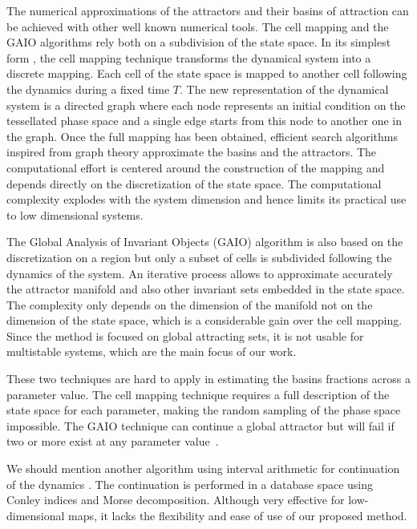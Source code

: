 \documentclass[preprint,superscriptaddress,
nofootinbib,amsmath,amssymb,aps]{revtex4-1}
\begin{document}
The numerical approximations of the attractors and their basins of attraction can be achieved with other well known numerical tools. The cell mapping and the GAIO algorithms rely both on a subdivision of the state space. In its simplest form \cite{sun2018cell}, the cell mapping technique transforms the dynamical system into a discrete mapping. Each cell of the state space is mapped to another cell following the dynamics during a fixed time $T$. The new representation of the dynamical system is a directed graph where each node represents an initial condition on the tessellated phase space and a single edge starts from this node to another one in the graph. Once the full mapping has been obtained, efficient search algorithms inspired from graph theory approximate the basins and the attractors. The computational effort is centered around the construction of the mapping and depends directly on the discretization of the state space. The computational complexity explodes with the system dimension and hence limits its practical use to low dimensional systems.

The Global Analysis of Invariant Objects (GAIO) algorithm \cite{dellnitz2001algorithms} is also based on the discretization on a region but only a subset of cells is subdivided following the dynamics of the system. An iterative process allows to approximate accurately the attractor manifold and also other invariant sets embedded in the state space. The complexity only depends on the dimension of the manifold not on the dimension of the state space, which is a considerable gain over the cell mapping. Since the method is focused on global attracting sets, it is not usable for multistable systems, which are the main focus of our work. 

These two techniques are hard to apply in estimating the basins fractions across a parameter value. The cell mapping technique requires a full description of the state space for each parameter, making the random sampling of the phase space impossible. The GAIO technique can continue a global attractor but will fail if two or more exist at any parameter value~\cite{gerlach2020set}.

We should mention another algorithm using interval arithmetic for continuation of the dynamics \cite{arai2009database}. The continuation is performed in a database space using Conley indices and Morse decomposition. Although very effective for low-dimensional maps, it lacks the flexibility and ease of use of our proposed method. 




\end{document}
